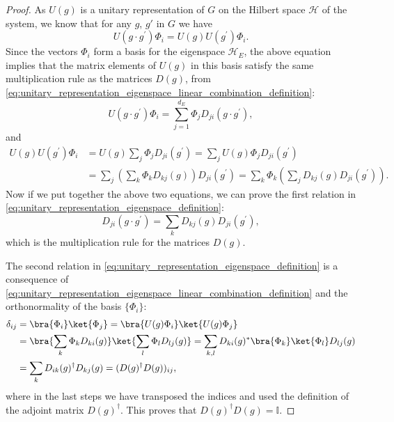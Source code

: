 \begin{proof}
    As \(U(g)\) is a unitary representation of \(G\) on the Hilbert space \(\mathcal{H}\) of the system, we know that for any \(g\), \(g'\) in \(G\) we have
    \[
        U(g \cdot g^{\prime}) \Phi_i = U(g) U(g^{\prime}) \Phi_i.
    \]
    Since the vectors \(\Phi_i\) form a basis for the eigenspace \(\mathcal{H}_E\), the above equation implies that the matrix elements of \(U(g)\) in this basis satisfy the same multiplication rule as the matrices \(D(g)\), from \eqref{eq:unitary_representation_eigenspace_linear_combination_definition}:
    \[
        U(g \cdot g^{\prime}) \Phi_i = \sum_{j=1}^{d_E} \Phi_j D_{ji}(g \cdot g^{\prime}),
    \]
    and
    \[
        \begin{aligned}
            U(g) U(g^{\prime}) \Phi_i & = U(g) \sum_{j} \Phi_j D_{ji}(g^{\prime}) = \sum_{j} U(g) \Phi_j D_{ji}(g^{\prime})                                                            \\
                                      & = \sum_{j} \left( \sum_{k} \Phi_k D_{kj}(g) \right) D_{ji}(g^{\prime}) = \sum_{k} \Phi_k \left( \sum_{j} D_{kj}(g) D_{ji}(g^{\prime}) \right).
        \end{aligned}
    \]
    Now if we put together the above two equations, we can prove the first relation in \eqref{eq:unitary_representation_eigenspace_definition}:
    \[
        D_{ji} (g \cdot g^{\prime}) = \sum_{k} D_{kj}(g) D_{ji}(g^{\prime}),
    \]
    which is the multiplication rule for the matrices \(D(g)\).

    The second relation in \eqref{eq:unitary_representation_eigenspace_definition} is a consequence of \eqref{eq:unitary_representation_eigenspace_linear_combination_definition} and the orthonormality of the basis \(\{\Phi_i\}\):
    \[
        \begin{aligned}
            \delta_{ij} & = \bra{\Phi_i} \ket{\Phi_j} = \bra{U(g) \Phi_i} \ket{U(g) \Phi_j}                                                               \\
                        & = \bra{\sum_{k} \Phi_k D_{ki}(g)} \ket{\sum_{l} \Phi_l D_{lj}(g)} = \sum_{k, l} D_{ki}(g)^* \bra{\Phi_k} \ket{\Phi_l} D_{lj}(g) \\
                        & = \sum_{k} D_{ik}(g)^{\dagger} D_{kj}(g) = (D(g)^{\dagger} D(g))_{ij},
        \end{aligned}
    \]
    where in the last steps we have transposed the indices and used the definition of the adjoint matrix \(D(g)^{\dagger}\). This proves that \(D(g)^{\dagger} D(g) = \mathbb{I}\).
\end{proof}

